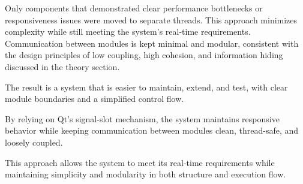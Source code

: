 Only components that demonstrated clear performance bottlenecks or responsiveness issues were moved to separate threads. This approach minimizes complexity while still meeting the system’s real-time requirements. Communication between modules is kept minimal and modular, consistent with the design principles of low coupling, high cohesion, and information hiding discussed in the theory section.

The result is a system that is easier to maintain, extend, and test, with clear module boundaries and a simplified control flow.

By relying on Qt’s signal-slot mechanism, the system maintains responsive behavior while keeping communication between modules clean, thread-safe, and loosely coupled.

This approach allows the system to meet its real-time requirements while maintaining simplicity and modularity in both structure and execution flow.




